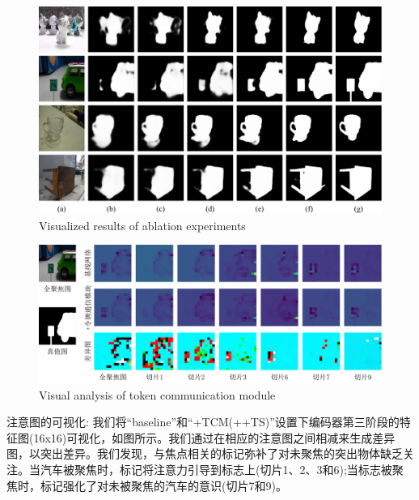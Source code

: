 \begin{figure}[b] 
	\includegraphics[width=0.99\linewidth]{figures/chapter3/self-comparsion-Use} 
	\centering
	{Visualized results of ablation experiments}
	\label{figure:self_comp}
\end{figure}


\begin{figure}[b] 
	\includegraphics[width=0.99\linewidth]{figures/chapter3/attn_cmp_turn} 
	\centering
	{Visual analysis of token communication module}
	\label{chpt3:figure:attn_tcm}
\end{figure}


\todo 

注意图的可视化:
我们将“baseline”和“+TCM(++TS)”设置下编码器第三阶段的特征图(16x16)可视化，如图所示。我们通过在相应的注意图之间相减来生成差异图，以突出差异。我们发现，与焦点相关的标记弥补了对未聚焦的突出物体缺乏关注。当汽车被聚焦时，标记将注意力引导到标志上(切片1、2、3和6);当标志被聚焦时，标记强化了对未被聚焦的汽车的意识(切片7和9)。


